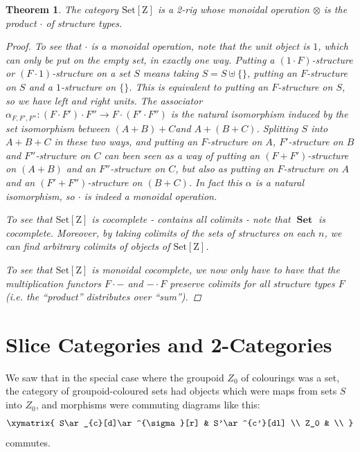 \documentclass{amsart} \usepackage{amsmath,amssymb,bbm}
\newcommand{\opname}[1]{\operatorname{#1}}
\newcommand{\catname}[1]{\boldsymbol{\opname{{#1}}}}
\newcommand{\Set}{\catname{Set}}
\newcommand{\SetZ}{\catname{Set [ Z ]}}
\newtheorem{theorem}{Theorem}
\begin{document}
\begin{theorem}
  The category $\SetZ$ is a 2-rig whose monoidal
  operation $\otimes$ is the product $\cdot$ of structure types.
  
  \begin{proof}
    To see that $\cdot$ is a monoidal operation, note that the unit object is
    $1$, which can only be put on the empty set, in exactly one way.  Putting
    a $( 1 \cdot F )$-structure or $( F \cdot 1 )$-structure on a set $S$
    means taking $S = S \uplus \{ \}$, putting an $F$-structure on $S$ and a
    $1$-structure on $\{ \}$.  This is equivalent to putting an $F$-structure
    on $S$, so we have left and right units.  The associator $\alpha_{F, F',
    F''} : ( F \cdot F' ) \cdot F'' \rightarrow F \cdot ( F' \cdot F'' )$ is
    the natural isomorphism induced by the set isomorphism between $( A + B )
    + C$and $A + ( B + C )$.  Splitting $S$ into $A + B + C$ in these two
    ways, and putting an $F$-structure on $A$, $F'$-structure on $B$ and
    $F''$-structure on $C$ can been seen as a way of putting an $( F + F'
    )$-structure on $( A + B )$ and an $F''$-structure on $C$, but also as
    putting an $F$-structure on $A$ and an $( F' + F'' )$-structure on $( B +
    C )$.  In fact this $\alpha$ is a natural isomorphism, so $\cdot$ is
    indeed a monoidal operation.
    
    To see that $\SetZ$ is cocomplete - contains all colimits - note
    that $\Set$ is cocomplete.  Moreover, by taking colimits of the
    sets of structures on each $n$, we can find arbitrary colimits of
    objects of $\SetZ$.
    
    To see that $\SetZ$ is monoidal cocomplete, we now
    only have to have that the multiplication functors $F \cdot -$ and $-
    \cdot F$ preserve colimits for all structure types $F$ (i.e. the
    ``product'' distributes over ``sum'').
    \end{proof}
\end{theorem}

{\pagebreak}

\section{Slice Categories and 2-Categories}\label{sec:slicecategory}

  We saw that in the special case where the groupoid $Z_0$ of
  colourings was a set, the category of groupoid-coloured sets had
  objects which were maps from sets $S$ into $Z_0$, and morphisms were
  commuting diagrams like this:
  \begin{equation}
    \xymatrix{    
      S\ar_{c}[d]\ar^{\sigma}[r] & S'\ar^{c'}[dl] \\
      Z_0 & \\
    }
  \end{equation}
  commutes.
\end{document}
